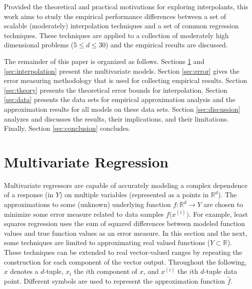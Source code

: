 \documentclass[smallextended,final]{svjour3}       %
\begin{document}
Provided the theoretical and practical motivations for exploring
interpolants, this work aims to study the empirical performance
differences between a set of scalable (moderately) interpolation
techniques and a set of common regression techniques. These techniques
are applied to a collection of moderately high dimensional problems
($5 \le d \le 30$) and the empirical results are discussed.

The remainder of this paper is organized as follows. Sections
\ref{sec:regression} and \ref{sec:interpolation} present the
multivariate models. Section \ref{sec:error} gives the error measuring
methodology that is used for collecting empirical results. Section
\ref{sec:theory} presents the theoretical error bounds for
interpolation. Section \ref{sec:data} presents the data sets for
empirical approximation analysis and the approximation results for all
models on these data sets. Section \ref{sec:discussion} analyzes and
discusses the results, their implications, and their
limitations. Finally, Section \ref{sec:conclusion} concludes.



\section{Multivariate Regression}
\label{sec:regression}
Multivariate regressors are capable of accurately modeling a complex
dependence of a response (in $Y$) on multiple variables (represented
as a points in $\mathbb{R}^{d}$). The approximations to some (unknown)
underlying function $f: \mathbb{R}^d \rightarrow Y$ are chosen to
minimize some error measure related to data samples
$f\bigl(x^{(i)}\bigr)$. For example, least squares regression uses the
sum of squared differences between modeled function values and true
function values as an error measure. In this section and the next,
some techniques are limited to approximating real valued functions ($Y
\subset \mathbb{R}$). These techniques can be extended to real
vector-valued ranges by repeating the construction for each component
of the vector output. Throughout the following, $x$ denotes a
$d$-tuple, $x_i$ the $i$th component of $x$, and $x^{(i)}$ the $i$th
$d$-tuple data point. Different symbols are used to represent the
approximation function $\hat f$.
\end{document}
